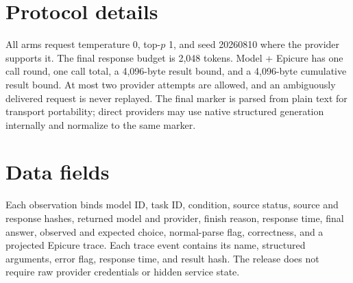 \documentclass[10pt,twocolumn]{article}
\begin{document}
\begin{table}[h!]
  \centering
  \resizebox{\columnwidth}{!}{%
  }
  \caption{All 20 model routes in the released leaderboard. Routes are selected before generation;
  automatic fallback is disabled.}
  \label{tab:routes}
\end{table}

\section{Protocol details}

All arms request temperature 0, top-$p$ 1, and seed 20260810 where the provider supports it. The
final response budget is 2,048 tokens. Model + Epicure has one call round, one call total, a
4,096-byte result bound, and a 4,096-byte cumulative result bound. At most two provider attempts
are allowed, and an ambiguously delivered request is never replayed. The final marker is parsed
from plain text for transport portability; direct providers may use native structured generation
internally and normalize to the same marker.

\section{Data fields}

Each observation binds model ID, task ID, condition, source status, source and response hashes,
returned model and provider, finish reason, response time, final answer, observed and expected
choice, normal-parse flag, correctness, and a projected Epicure trace. Each trace event contains its
name, structured arguments, error flag, response time, and result hash. The release does not require
raw provider credentials or hidden service state.

\clearpage


\end{document}
